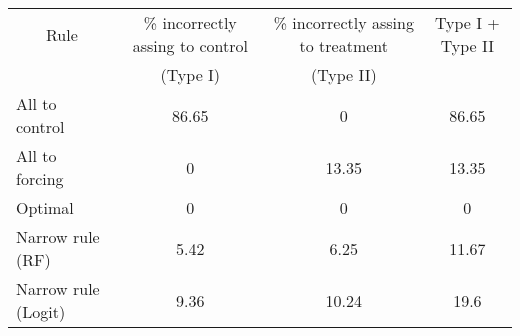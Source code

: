 \begin{tabular}{lccc}
\toprule
\multicolumn{1}{c}{Rule} & \% incorrectly assing to control  & \% incorrectly assing to treatment & Type I + Type II \\
      & (Type I) & (Type II) &  \\
\midrule
\midrule
All to control & 86.65 & 0     & 86.65 \\
All to forcing & 0     & 13.35 & 13.35 \\
Optimal & 0     & 0     & 0 \\
Narrow rule (RF) & 5.42  & 6.25  & 11.67 \\
Narrow rule (Logit) & 9.36  & 10.24 & 19.6 \\
\bottomrule
\bottomrule
\end{tabular}%
